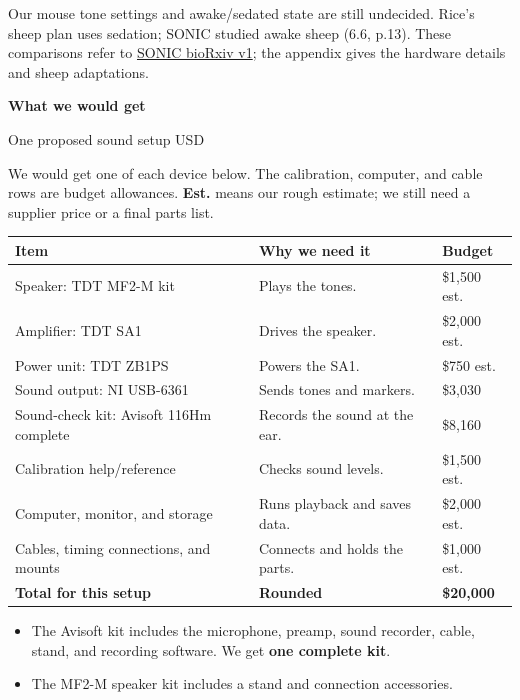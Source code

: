 \documentclass[12pt,letterpaper]{article}
\newcommand{\topic}[1]{\vspace{7pt}{\large\bfseries #1}\par}
\begin{document}
{\small\color{muted}Our mouse tone settings and awake/sedated state are still undecided. Rice's sheep plan uses sedation; SONIC studied awake sheep (6.6, p.13). These comparisons refer to \href{https://doi.org/10.1101/2025.09.30.679683}{SONIC bioRxiv v1}; the appendix gives the hardware details and sheep adaptations.}

\newpage
{\LARGE\bfseries What we would get}\par
{\color{muted}One proposed sound setup \hfill USD}\par

We would get one of each device below. The calibration, computer, and cable rows are budget allowances. \textbf{Est.} means our rough estimate; we still need a supplier price or a final parts list.

{\small\renewcommand{\arraystretch}{1.3}
\begin{tabularx}{\linewidth}{@{}>{\raggedright\arraybackslash}p{2.72in} L >{\raggedleft\arraybackslash}p{1.1in}@{}}
\toprule
\textbf{Item} & \textbf{Why we need it} & \textbf{Budget} \\
\midrule
Speaker: TDT MF2-M kit & Plays the tones. & \$1,500 est. \\
Amplifier: TDT SA1 & Drives the speaker. & \$2,000 est. \\
Power unit: TDT ZB1PS & Powers the SA1. & \$750 est. \\
Sound output: NI USB-6361 & Sends tones and markers. & \$3,030 \\
Sound-check kit: Avisoft 116Hm complete & Records the sound at the ear. & \$8,160 \\
Calibration help/reference & Checks sound levels. & \$1,500 est. \\
Computer, monitor, and storage & Runs playback and saves data. & \$2,000 est. \\
Cables, timing connections, and mounts & Connects and holds the parts. & \$1,000 est. \\
\midrule
\textbf{Total for this setup} & \textbf{Rounded} & \textbf{\$20,000} \\
\bottomrule
\end{tabularx}}

\topic{The kits already cover several parts}
\begin{itemize}
\item The Avisoft kit includes the microphone, preamp, sound recorder, cable, stand, and recording software. We get \textbf{one complete kit}.
\item The MF2-M speaker kit includes a stand and connection accessories.
\end{itemize}
\end{document}
